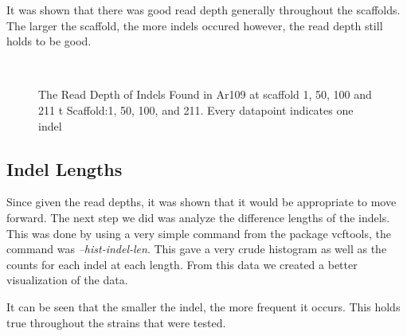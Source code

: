 It was shown that there was good read depth generally throughout the scaffolds. The larger the scaffold, the more indels occured however, the read depth still holds to be good. 

\begin{figure}[H]
	\begin{centering}
		\vspace{1.5cm}
		\\
		\begin{singlespace}
			\vspace{-0.5cm}
			\caption[The Read Depth of Indels Found]{The Read Depth of Indels Found in Ar109 at scaffold 1, 50, 100 and 211
				t Scaffold:1, 50, 100, and 211. Every datapoint indicates one indel}\label{readdepth_indel}
		\end{singlespace}
	\end{centering}
\end{figure}

\subsection{Indel Lengths}  

Since given the read depths, it was shown that it would be appropriate to move forward. The next step we did was analyze the difference lengths of the indels. This was done by using a very simple command from the package vcftools, the command was \textit{--hist-indel-len}. This gave a very crude histogram as well as the counts for each indel at each length. From this data we created a better visualization of the data. 

It can be seen that the smaller the indel, the more frequent it occurs. This holds true throughout the strains that were tested.

